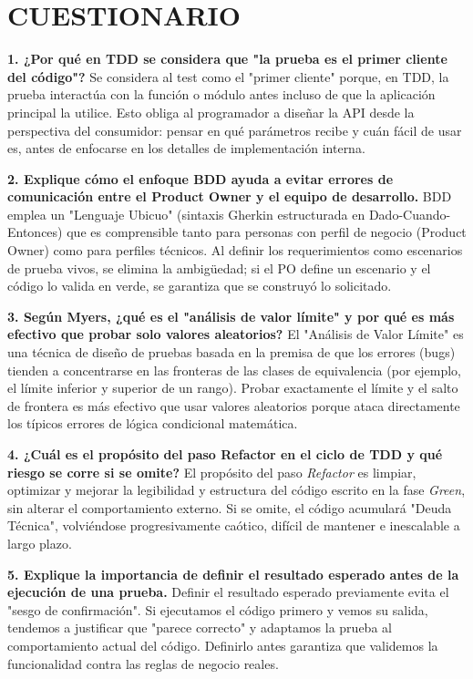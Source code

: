 \documentclass{article}
\begin{document}
\clearpage

\section{CUESTIONARIO}
\textbf{1. ¿Por qué en TDD se considera que "la prueba es el primer cliente del código"?}
\vspace{0.2cm}
Se considera al test como el "primer cliente" porque, en TDD, la prueba interactúa con la función o módulo antes incluso de que la aplicación principal la utilice. Esto obliga al programador a diseñar la API desde la perspectiva del consumidor: pensar en qué parámetros recibe y cuán fácil de usar es, antes de enfocarse en los detalles de implementación interna.

\textbf{2. Explique cómo el enfoque BDD ayuda a evitar errores de comunicación entre el Product Owner y el equipo de desarrollo.}
\vspace{0.2cm}
BDD emplea un "Lenguaje Ubicuo" (sintaxis Gherkin estructurada en Dado-Cuando-Entonces) que es comprensible tanto para personas con perfil de negocio (Product Owner) como para perfiles técnicos. Al definir los requerimientos como escenarios de prueba vivos, se elimina la ambigüedad; si el PO define un escenario y el código lo valida en verde, se garantiza que se construyó lo solicitado.

\textbf{3. Según Myers, ¿qué es el "análisis de valor límite" y por qué es más efectivo que probar solo valores aleatorios?}
\vspace{0.2cm}
El "Análisis de Valor Límite" es una técnica de diseño de pruebas basada en la premisa de que los errores (bugs) tienden a concentrarse en las fronteras de las clases de equivalencia (por ejemplo, el límite inferior y superior de un rango). Probar exactamente el límite y el salto de frontera es más efectivo que usar valores aleatorios porque ataca directamente los típicos errores de lógica condicional matemática.

\textbf{4. ¿Cuál es el propósito del paso Refactor en el ciclo de TDD y qué riesgo se corre si se omite?}
\vspace{0.2cm}
El propósito del paso \textit{Refactor} es limpiar, optimizar y mejorar la legibilidad y estructura del código escrito en la fase \textit{Green}, sin alterar el comportamiento externo. Si se omite, el código acumulará "Deuda Técnica", volviéndose progresivamente caótico, difícil de mantener e inescalable a largo plazo.

\textbf{5. Explique la importancia de definir el resultado esperado antes de la ejecución de una prueba.}
\vspace{0.2cm}
Definir el resultado esperado previamente evita el "sesgo de confirmación". Si ejecutamos el código primero y vemos su salida, tendemos a justificar que "parece correcto" y adaptamos la prueba al comportamiento actual del código. Definirlo antes garantiza que validemos la funcionalidad contra las reglas de negocio reales.
\end{document}
